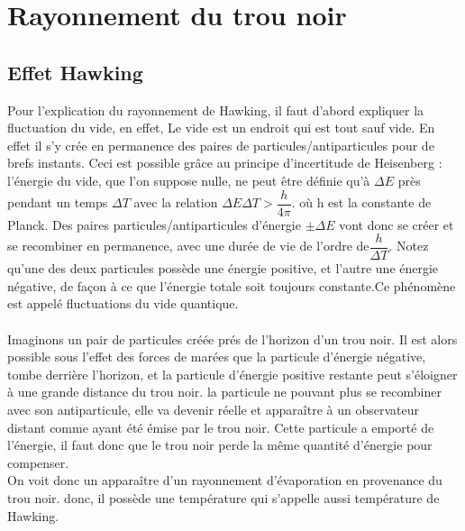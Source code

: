 \documentclass[12pt,  a4paper, openright]{report} %
\begin{document}
\section{Rayonnement du trou noir}
\subsection{Effet Hawking}
Pour l'explication du rayonnement de Hawking, il faut d'abord expliquer la fluctuation du vide, en effet, Le vide est un endroit qui est tout sauf vide. En effet il s'y crée en permanence des paires de
particules/antiparticules pour de brefs instants. Ceci est possible grâce au principe d'incertitude
de Heisenberg : l'énergie du vide, que l'on suppose nulle, ne peut être définie qu'à $\Delta E$ près
pendant un temps $\Delta T$ avec la relation $\Delta E \Delta T > \dfrac{h}{4 \pi}$. où h est la constante de Planck. Des paires particules/antiparticules d'énergie $\pm \Delta E$ vont donc se créer et se recombiner en permanence, avec une durée de vie de l'ordre de$ \dfrac{h}{\Delta T}$. Notez qu'une des deux particules possède une énergie positive, et l'autre une énergie négative, de façon à ce que l'énergie totale soit toujours constante.Ce phénomène est appelé fluctuations du vide quantique.\\
\\
Imaginons un pair de particules créée prés de l'horizon d'un trou noir. Il est alors possible
sous l'effet des forces de marées que la particule d'énergie négative, tombe derrière l'horizon,
et la particule d'énergie positive restante peut s'éloigner à une grande distance du trou noir.
la particule ne pouvant plus se recombiner avec son antiparticule, elle va devenir réelle et
apparaître à un observateur distant comme ayant été émise par le trou noir. Cette particule
a emporté de l'énergie, il faut donc que le trou noir perde la même quantité d'énergie pour
compenser.\\
On voit donc un apparaître d'un rayonnement d'évaporation en provenance du trou noir. donc,
il possède une température qui s'appelle aussi température de Hawking.
\end{document}
